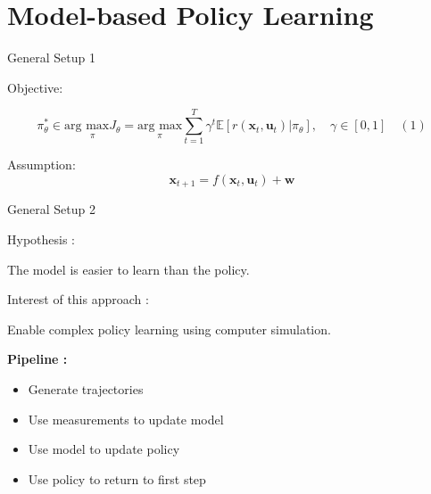\documentclass[10pt]{beamer}
\begin{document}
\section{Model-based Policy Learning}

\begin{frame}[fragile]{General Setup 1}

\begin{alertblock}{Objective:}


$$ 
{\pi}_{\theta}^{*} \in  \underset {\pi}{\text{arg max} { J }_{ \theta  } }  =  \underset { \pi  }{  \text{arg max} } \sum _{ t=1 }^{ T }{ { \gamma  }^{ t }\mathbb{E}[ r({ \bm{x} }_{ t },{ \bm{u} }_{ t }) | { \pi  }_{ \theta  }]  }, \quad \gamma \in [0,1] \quad  (1)
$$
\end{alertblock}

\begin{exampleblock}{Assumption:}
$$
 \bm{x}_{t+1}=f(\bm{x}_{t},\bm{u}_{t}) +\bm{w} 
$$

\end{exampleblock}
\end{frame}

\begin{frame}{General Setup 2}

\begin{exampleblock}{Hypothesis :}

The model is easier to learn than the policy.
\end{exampleblock}
\begin{alertblock}{Interest of this approach :}
\end{alertblock}
Enable complex policy learning using computer simulation.

\textbf{Pipeline :}
\begin{itemize}
  \item Generate trajectories
  
  \item Use measurements to update model
 
  \item Use model to update policy
  
  \item Use policy to return to first step
\end{itemize}

\end{frame}
\end{document}

